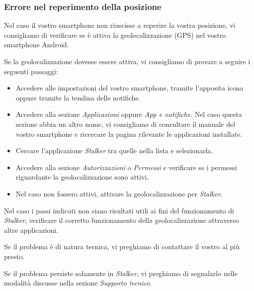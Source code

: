\documentclass[../manuale-utente.tex]{subfiles}
\begin{document}
\subsubsection{Errore nel reperimento della posizione}%
\label{subs:mobile_app_errore_posizione}

Nel caso il vostro smartphone non riuscisse a reperire la vostra posizione, vi consigliamo di verificare se è attiva la geolocalizzazione (GPS) nel vostro smartphone Android.

Se la geolocalizzazione dovesse essere attiva, vi consigliamo di provare a seguire i seguenti passaggi:
\begin{itemize}
    \item Accedere alle impostazioni del vostro smartphone, tramite l'apposita icona oppure tramite la tendina delle notifiche.
    \item Accedere alla sezione \textit{Applicazioni} oppure \textit{App e notifiche}. Nel caso questa sezione abbia un altro nome, vi consigliamo di consultare il manuale del vostro smartphone e ricercare la pagina rilevante le applicazioni installate.
    \item Cercare l'applicazione \textit{Stalker} tra quelle nella lista e selezionarla.
    \item Accedere alla sezione \textit{Autorizzazioni} o \textit{Permessi} e verificare se i permessi riguardante la geolocalizzazione sono attivi.
    \item Nel caso non fossero attivi, attivare la geolocalizzazione per \textit{Stalker}.
\end{itemize}

Nel caso i passi indicati non siano risultati utili ai fini del funzionamento di \textit{Stalker}, verificare il corretto funzionamento della geolocalizzazione attraverso altre applicazioni.

Se il problema è di natura tecnica, vi preghiamo di contattare il vostro \textit{} al più presto.

Se il problema persiste solamente in \textit{Stalker}, vi preghiamo di segnalarlo nelle modalità discusse nella sezione \textit{Supporto tecnico}.
\end{document}
